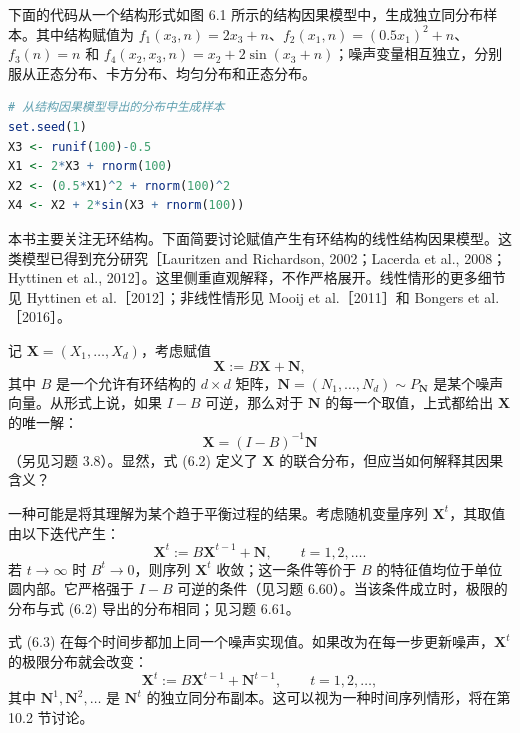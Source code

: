 

\par\noindent\begin{minipage}{\linewidth}
\begin{codesnippet}
下面的代码从一个结构形式如图 6.1 所示的结构因果模型中，生成独立同分布样本。其中结构赋值为 $f_1(x_3,n)=2x_3+n$、$f_2(x_1,n)=(0.5x_1)^2+n$、$f_3(n)=n$ 和 $f_4(x_2,x_3,n)=x_2+2\sin(x_3+n)$；噪声变量相互独立，分别服从正态分布、卡方分布、均匀分布和正态分布。
\begin{lstlisting}[language=R]
# 从结构因果模型导出的分布中生成样本
set.seed(1)
X3 <- runif(100)-0.5
X1 <- 2*X3 + rnorm(100)
X2 <- (0.5*X1)^2 + rnorm(100)^2
X4 <- X2 + 2*sin(X3 + rnorm(100))
\end{lstlisting}
\end{codesnippet}
\end{minipage}\par

\begin{remark}[线性有环赋值]
本书主要关注无环结构。下面简要讨论赋值产生有环结构的线性结构因果模型。这类模型已得到充分研究［Lauritzen and Richardson, 2002；Lacerda et al., 2008；Hyttinen et al., 2012］。这里侧重直观解释，不作严格展开。线性情形的更多细节见 Hyttinen et al.［2012］；非线性情形见 Mooij et al.［2011］和 Bongers et al.［2016］。

记 $\mathbf X=(X_1,\ldots,X_d)$，考虑赋值
\[
 \mathbf X:=B\mathbf X+\mathbf N,
\]
其中 $B$ 是一个允许有环结构的 $d\times d$ 矩阵，$\mathbf N=(N_1,\ldots,N_d)\sim P_{\mathbf N}$ 是某个噪声向量。从形式上说，如果 $I-B$ 可逆，那么对于 $\mathbf N$ 的每一个取值，上式都给出 $\mathbf X$ 的唯一解：
\begin{equation}
 \mathbf X=(I-B)^{-1}\mathbf N
 \tag{6.2}
\end{equation}
（另见习题 3.8）。显然，式 (6.2) 定义了 $\mathbf X$ 的联合分布，但应当如何解释其因果含义？

一种可能是将其理解为某个趋于平衡过程的结果。考虑随机变量序列 $\mathbf X^t$，其取值由以下迭代产生：
\begin{equation}
 \mathbf X^t:=B\mathbf X^{t-1}+\mathbf N,\qquad t=1,2,\ldots.
 \tag{6.3}
\end{equation}
若 $t\to\infty$ 时 $B^t\to0$，则序列 $\mathbf X^t$ 收敛；这一条件等价于 $B$ 的特征值均位于单位圆内部。它严格强于 $I-B$ 可逆的条件（见习题 6.60）。当该条件成立时，极限的分布与式 (6.2) 导出的分布相同；见习题 6.61。

式 (6.3) 在每个时间步都加上同一个噪声实现值。如果改为在每一步更新噪声，$\mathbf X^t$ 的极限分布就会改变：
\begin{equation}
 \mathbf X^t:=B\mathbf X^{t-1}+\mathbf N^{t-1},\qquad t=1,2,\ldots,
 \tag{6.4}
\end{equation}
其中 $\mathbf N^1,\mathbf N^2,\ldots$ 是 $\mathbf N^t$ 的独立同分布副本。这可以视为一种时间序列情形，将在第 10.2 节讨论。
\end{remark}

